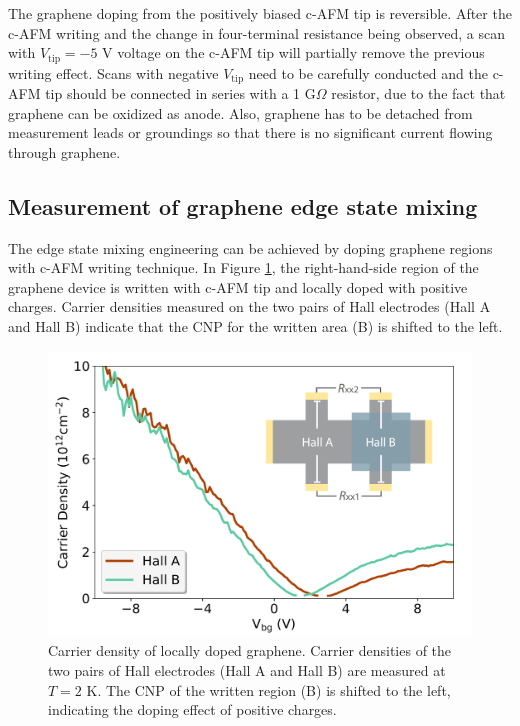 \documentclass[pdflatex, sectionletters, 12pt]{pittetd}    %
\begin{document}
The graphene doping from the positively biased c-AFM tip is reversible. After the c-AFM writing and the change in four-terminal resistance being observed, a scan with $V_\mathrm{tip}= -5$ V voltage on the c-AFM tip will partially remove the previous writing effect. Scans with negative $V_\mathrm{tip}$ need to be carefully conducted and the c-AFM tip should be connected in series with a 1 G$\Omega$ resistor, due to the fact that graphene can be oxidized as anode\cite{alaboson2011conductive, byun2011nanoscale}. Also, graphene has to be detached from measurement leads or groundings so that there is no significant current flowing through graphene\cite{alaboson2011conductive}. 

\subsection{Measurement of graphene edge state mixing}

The edge state mixing engineering can be achieved by doping graphene regions with c-AFM writing technique. In Figure \ref{FIG:GrapheneDopedHall}, the right-hand-side region of the graphene device is written with c-AFM tip and locally doped with positive charges. Carrier densities measured on the two pairs of Hall electrodes (Hall A and Hall B) indicate that the CNP for the written area (B) is shifted to the left.
\\

\begin{figure}[h!]
	\centering
	\includegraphics[width=.7\textwidth]{Drawing/GrapheneDopedHall.pdf}
	\caption{Carrier density of locally doped graphene. Carrier densities of the two pairs of Hall electrodes (Hall A and Hall B) are measured at $T = 2$ K. The CNP of the written region (B) is shifted to the left, indicating the doping effect of positive charges.}
	\label{FIG:GrapheneDopedHall}
\end{figure}
\end{document}
